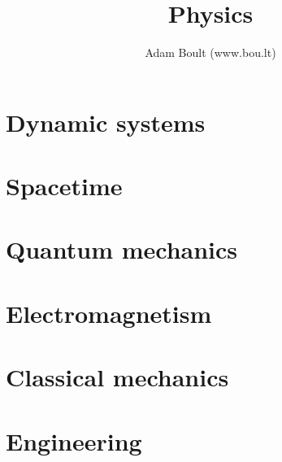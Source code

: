 \documentclass[oneside]{book}
\begin{document}
\author{Adam Boult (www.bou.lt)}
\title{Physics}
\maketitle

\setcounter{tocdepth}{1}
\tableofcontents



\part{Dynamic systems}


\part{Spacetime}




\part{Quantum mechanics}



\part{Electromagnetism}

\part{Classical mechanics}


\part{Engineering}

\end{document}

